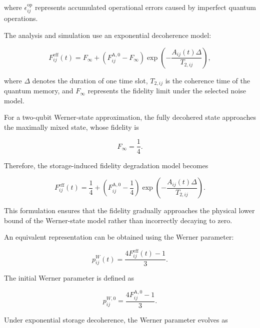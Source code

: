 where $\epsilon_{ij}^{\mathrm{op}}$ represents accumulated operational errors caused by imperfect quantum operations.

The analysis and simulation use an exponential decoherence model:

\begin{equation}
    F_{ij}^{\mathrm{eff}}(t)
    =
    F_{\infty}
    +
    \left(
    F_{ij}^{\mathrm{A},0}
    -
    F_{\infty}
    \right)
    \exp
    \left(
    -\frac{
    A_{ij}(t)\Delta
    }{
    T_{2,ij}
    }
    \right),
\end{equation}

where $\Delta$ denotes the duration of one time slot, $T_{2,ij}$ is the coherence time of the quantum memory, and $F_{\infty}$ represents the fidelity limit under the selected noise model.

For a two-qubit Werner-state approximation, the fully decohered state approaches the maximally mixed state, whose fidelity is

\begin{equation}
    F_{\infty}
    =
    \frac{1}{4}.
\end{equation}

Therefore, the storage-induced fidelity degradation model becomes

\begin{equation}
    F_{ij}^{\mathrm{eff}}(t)
    =
    \frac{1}{4}
    +
    \left(
    F_{ij}^{\mathrm{A},0}
    -
    \frac{1}{4}
    \right)
    \exp
    \left(
    -\frac{
    A_{ij}(t)\Delta
    }{
    T_{2,ij}
    }
    \right).
\end{equation}

This formulation ensures that the fidelity gradually approaches the physical lower bound of the Werner-state model rather than incorrectly decaying to zero.

An equivalent representation can be obtained using the Werner parameter:

\begin{equation}
    p_{ij}^{W}(t)
    =
    \frac{
    4F_{ij}^{\mathrm{eff}}(t)-1
    }{3}.
\end{equation}

The initial Werner parameter is defined as

\begin{equation}
    p_{ij}^{W,0}
    =
    \frac{
    4F_{ij}^{\mathrm{A},0}-1
    }{3}.
\end{equation}

Under exponential storage decoherence, the Werner parameter evolves as

